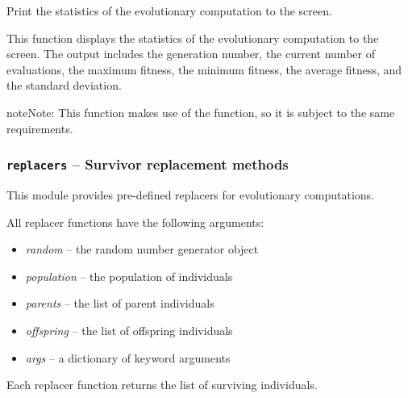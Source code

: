 \documentclass[letterpaper,10pt,english]{sphinxmanual}
\begin{document}
\begin{fulllineitems}
\label{reference:inspyred.ec.observers.stats_observer}
Print the statistics of the evolutionary computation to the screen.

This function displays the statistics of the evolutionary computation
to the screen. The output includes the generation number, the current
number of evaluations, the maximum fitness, the minimum fitness, 
the average fitness, and the standard deviation.

\begin{notice}{note}{Note:}
This function makes use of the  
function, so it is subject to the same requirements.
\end{notice}

\end{fulllineitems}

\label{reference:module-inspyred.ec.replacers}

\subsubsection{\texttt{replacers} -- Survivor replacement methods}
\label{reference:replacers-survivor-replacement-methods}
This module provides pre-defined replacers for evolutionary computations.

All replacer functions have the following arguments:
\begin{itemize}
\item {} 
\emph{random} -- the random number generator object

\item {} 
\emph{population} -- the population of individuals

\item {} 
\emph{parents} -- the list of parent individuals

\item {} 
\emph{offspring} -- the list of offspring individuals

\item {} 
\emph{args} -- a dictionary of keyword arguments

\end{itemize}

Each replacer function returns the list of surviving individuals.
\label{reference:module-replacers}
\end{document}
